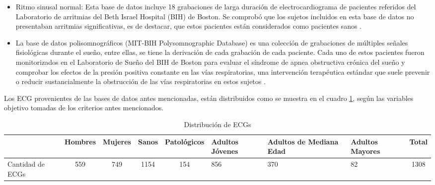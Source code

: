 \documentclass[12pt,letterpaper,oneside,openright]{book}
\begin{document}
\begin{itemize}
	\item Ritmo sinusal normal: Esta base de datos incluye 18 grabaciones de larga duración de electrocardiograma de pacientes referidos del Laboratorio de arritmias del Beth Israel Hospital (BIH) de Boston. Se comprobó que los sujetos incluidos en esta base de datos no presentaban arritmias significativas, es de destacar, que estos pacientes están considerados como pacientes sanos \cite{normalsinusrhythmdb}. 
	\item La base de datos polisomnográficos (MIT-BIH Polysomnographic Database) es una colección de grabaciones de múltiples señales fisiológicas durante el sueño, entre ellas, se tiene la derivación  de cada grabación de cada paciente. Cada uno de estos pacientes fueron monitorizados en el Laboratorio de Sueño del BIH de Boston para evaluar el síndrome de apnea obstructiva crónica del sueño y comprobar los efectos de la presión positiva constante en las vías respiratorias, una intervención terapéutica estándar que suele prevenir o reducir sustancialmente la obstrucción de las vías respiratorias en estos sujetos \cite{polysomnogradb}.
	
\end{itemize}
Los ECG provenientes de las bases de datos antes mencionadas, están distribuidos como se muestra en el cuadro \ref{tab:distriECGs}, según las variables objetivo tomadas de los criterios antes mencionados. 
\begin{table}[t]
	\begin{center}
		\begin{tabular}{p{1.7cm}|c|c|c|c|p{1.7cm}|p{2cm}|p{1.7cm}|c}
			
			& Hombres & Mujeres & Sanos & Patológicos & Adultos Jóvenes & Adultos de Mediana Edad & Adultos Mayores & Total \\
			\hline
			Cantidad de ECGs & 559 & 749 & 1154 & 154 & 856 & 370 & 82 & 1308 \\
			
		\end{tabular}
		\caption{Distribución de ECGs}
		\label{tab:distriECGs}
	\end{center}
\end{table}
\end{document}

